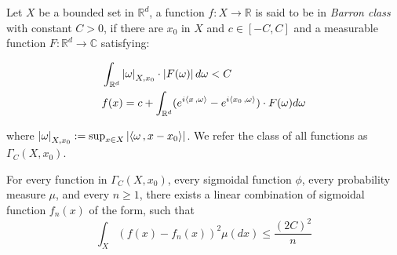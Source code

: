 \begin{definition}
    Let $X$ be a bounded set in $\mathbb{R}^d$, a function 
    $f: X \to \mathbb{R}$ is said to be in
    \textit{Barron class} with constant $C > 0$, if there
    are $x_0$ in $X$ and $c \in [-C, C]$ and a measurable function
    $F: \mathbb{R}^d \to \mathbb{C}$ satisfying:

    \begin{align}
        &\int_{\mathbb{R}^d} \left| \omega \right|_{X, x_0} \cdot \left| F(\omega) \right| d\omega < C \\
        &f(x) = c + \int_{\mathbb{R}^d} (e^{i\left\langle x\, , \omega \right\rangle} - e^{i\left\langle x_0\, , \omega \right\rangle}) \cdot F(\omega) d\omega
    \end{align}

    where $\left| \omega \right|_{X, x_0} := \sup_{x\in X}\left| \left\langle \omega\, , x - x_0 \right\rangle \right|$.
    We refer the class of all functions as $\Gamma_C(X, x_0)$.
\end{definition}

\begin{theorem}\cite[Theorem~1]{barronUniversalApproximationBounds1993}\label{thm:barron_1993_1}
    For every function in $\Gamma_C(X, x_0)$, every sigmoidal function
    $\phi$, every probability measure $\mu$, and every $n \geq 1$,
    there exists a linear combination of sigmoidal function $f_n(x)$ of 
    the form, such that
    \begin{equation}
        \int_X(f(x) - f_n(x))^2 \mu(dx) \leq \frac{(2C)^2}{n}
    \end{equation}
\end{theorem}


